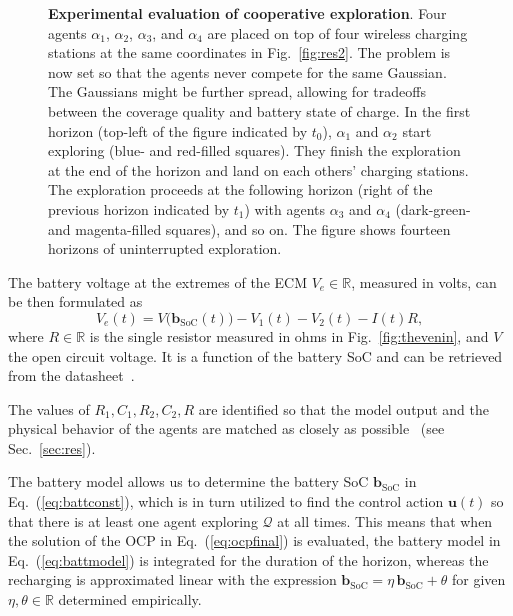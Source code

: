 \documentclass[letterpaper,10pt,conference,twoside]{IEEEtran}
\theoremstyle{definition}
\begin{document}
\begin{figure*}[t!]
  \vspace*{.17cm}
  \begin{minipage}[t]{1\columnwidth}
    
  \end{minipage}
  \hspace{.42cm}
  \begin{minipage}[t]{.97\columnwidth}
    \vspace*{-4.2cm}
    \caption{\textbf{Experimental evaluation of cooperative exploration}. Four agents $\alpha_1$, $\alpha_2$, $\alpha_3$, and $\alpha_4$ are placed on top of four wireless charging stations at the same coordinates in Fig.~\ref{fig:res2}. The problem is now set so %
    that the agents never compete for the same Gaussian. The Gaussians might be further spread, allowing for tradeoffs between the coverage quality and battery state of charge. In the first horizon (top-left of the figure indicated by $t_0$), $\alpha_1$ and $\alpha_2$ start exploring (blue- and red-filled squares). They finish the exploration at the end of the horizon and land on each others' charging stations. The exploration proceeds at the following horizon (right of the previous horizon indicated by $t_1$) with agents $\alpha_3$ and $\alpha_4$ (dark-green- and magenta-filled squares), and so on. The figure shows fourteen horizons of uninterrupted exploration.}
    \label{fig:res}
  \end{minipage}
  \vspace*{-.5cm}
\end{figure*}

The battery voltage at the extremes of the ECM $V_e\in\mathbb{R}$, measured in volts, can be then formulated as%
\begin{equation}
  V_e(t)=V\big(\mathbf{b}_{\text{SoC}}(t)\big)-V_1(t)-V_2(t)-I(t)R,
\end{equation}
where $R\in\mathbb{R}$ is the single resistor measured in ohms in Fig.~\ref{fig:thevenin}, and $V$ the open circuit voltage. It is a function of the battery SoC and can be retrieved from the %
datasheet~\cite{hinz2019comparison}.

The values of $R_1,C_1,R_2,C_2,R$ are identified so that the model output and the physical behavior of the agents are matched as closely as possible~\cite{zhao2017observability} (see Sec.~\ref{sec:res}).

The battery model allows us to determine the battery SoC $\mathbf{b}_{\text{SoC}}$ in Eq.~(\ref{eq:battconst}), which is in turn utilized to find the control action $\mathbf{u}(t)$ so that there is at least one agent exploring $\mathcal{Q}$ at all times. This means that when the solution of the OCP in Eq.~(\ref{eq:ocpfinal}) is evaluated, the battery model in Eq.~(\ref{eq:battmodel}) is integrated for the duration of the horizon, whereas the recharging is approximated linear with the expression $\mathbf{b}_{\text{SoC}}=\eta\,\mathbf{b}_{\text{SoC}}+\theta$ for given $\eta,\theta\in\mathbb{R}$ determined empirically.
\end{document}
